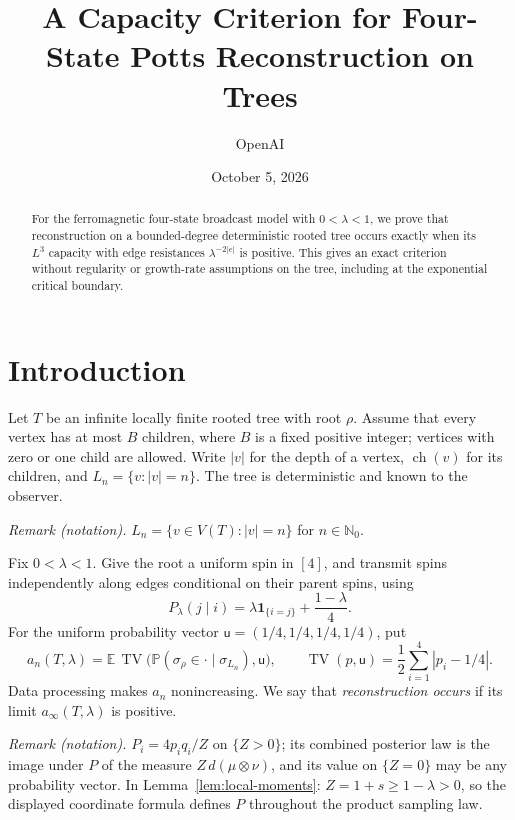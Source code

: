 \documentclass[11pt]{article}
\title{A Capacity Criterion for Four-State Potts Reconstruction on Trees}
\author{OpenAI}
\date{October 5, 2026}
\numberwithin{equation}{section}
\newcommand{\E}{\mathbb E}
\newcommand{\Prob}{\mathbb P}
\newcommand{\unif}{\mathsf u}
\newcommand{\TV}{\operatorname{TV}}
\newcommand{\children}{\operatorname{ch}}
\begin{document}
\maketitle

\begin{abstract}
For the ferromagnetic four-state broadcast model with $0<\lambda<1$,
we prove that reconstruction on a bounded-degree deterministic rooted
tree occurs exactly when its $L^3$ capacity with edge resistances
$\lambda^{-2|e|}$ is positive. This gives an exact criterion without
regularity or growth-rate assumptions on the tree, including at the
exponential critical boundary.
\end{abstract}

\section{Introduction}
\label{sec:introduction}

Let $T$ be an infinite locally finite rooted tree with root $\rho$.
Assume that every vertex has at most $B$ children, where $B$ is a
fixed positive integer; vertices with zero or one child are allowed.
Write $|v|$ for the depth of a vertex, $\children(v)$ for its
children, and $L_n=\{v:|v|=n\}$. The tree is deterministic and
known to the observer.

\noindent\textit{Remark (notation).} $L_n=\{v\in V(T):|v|=n\}$ for $n\in\mathbb N_0$.


Fix $0<\lambda<1$. Give the root a uniform spin in $[4]$, and
transmit spins independently along edges conditional on their
parent spins, using
\begin{equation}\label{eq:channel}
 P_\lambda(j\mid i)
 =\lambda\mathbf1_{\{i=j\}}+\frac{1-\lambda}{4}.
\end{equation}
For the uniform probability vector $\unif=(1/4,1/4,1/4,1/4)$, put
\[
 a_n(T,\lambda)=
 \E\,\TV\bigl(\Prob(\sigma_\rho\in\cdot\mid\sigma_{L_n}),
                    \unif\bigr),
 \qquad
 \TV(p,\unif)=\frac12\sum_{i=1}^4|p_i-1/4|.
\]
Data processing makes $a_n$ nonincreasing. We say that
\emph{reconstruction occurs} if its limit $a_\infty(T,\lambda)$
is positive.

\noindent\textit{Remark (notation).} $P_i=4p_iq_i/Z$ on $\{Z>0\}$; its combined posterior law is the image under $P$ of the measure $Z\,d(\mu\otimes\nu)$, and its value on $\{Z=0\}$ may be any probability vector. In Lemma~\ref{lem:local-moments}: $Z=1+s\geq1-\lambda>0$, so the displayed coordinate formula defines $P$ throughout the product sampling law.
\end{document}
